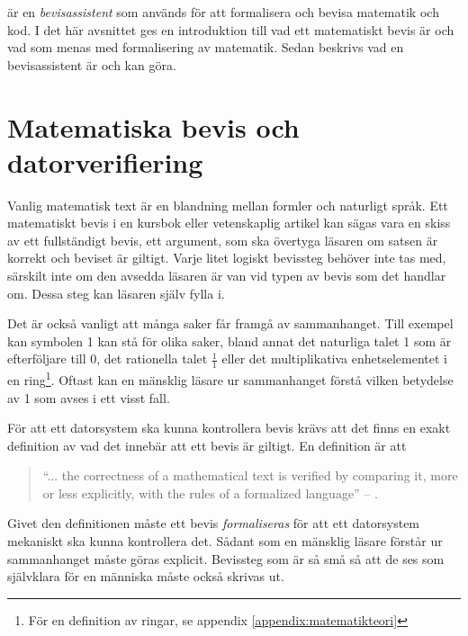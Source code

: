 \coq är en \emph{bevisassistent} som används för att formalisera och bevisa
matematik och kod.
I det här avsnittet ges en introduktion till vad ett matematiskt bevis är och vad som menas med
formalisering av matematik. Sedan beskrivs vad en bevisassistent är och kan
göra.

\section{Matematiska bevis och datorverifiering}
Vanlig matematisk text är en blandning mellan formler och naturligt språk. Ett
matematiskt bevis i en kursbok eller vetenskaplig artikel kan sägas vara en
skiss av ett fullständigt bevis, ett argument, som ska övertyga läsaren om
satsen är korrekt och beviset är giltigt. Varje litet logiskt bevissteg behöver
inte tas med, särskilt inte om den avsedda läsaren är van vid typen av bevis
som det handlar om. Dessa steg kan läsaren själv fylla i.


Det är också vanligt att många saker får framgå av sammanhanget.
Till
exempel kan symbolen 1 kan stå för olika saker, bland annat det naturliga talet
1 som är efterföljare till 0, det rationella talet $\frac{1}{1}$ eller det
multiplikativa enhetselementet i en ring\footnote{För en definition av ringar,
se appendix \ref{appendix:matematikteori}}. Oftast kan en mänsklig läsare ur
sammanhanget förstå vilken betydelse av 1 som avses i ett visst fall.

För att ett datorsystem ska kunna kontrollera bevis krävs att det finns en
exakt definition av vad det innebär att ett bevis är giltigt. En definition är
att
\begin{quote}
``... the correctness of a mathematical text is verified by comparing it, more or
less explicitly, with the rules of a formalized language'' -- \cite{bourbaki1968sets}.
\end{quote}

Givet den definitionen måste ett bevis \emph{formaliseras} för att ett
datorsystem mekaniskt ska kunna kontrollera det. Sådant som en mänsklig läsare
förstår ur sammanhanget måste göras explicit. Bevissteg som är så små så att de
ses som självklara för en människa måste också skrivas ut.

